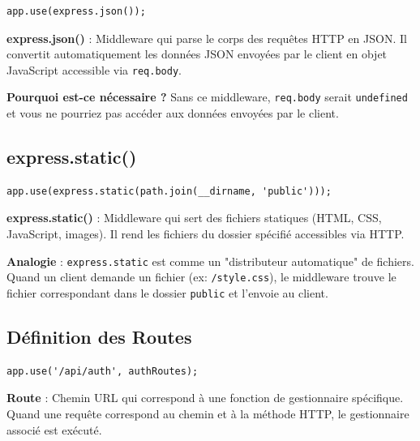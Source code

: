 \begin{lstlisting}[style=javascript]
app.use(express.json());
\end{lstlisting}

\begin{definitionbox}
    \textbf{express.json()} : Middleware qui parse le corps des requêtes HTTP en JSON. Il convertit automatiquement les données JSON envoyées par le client en objet JavaScript accessible via \texttt{req.body}.
\end{definitionbox}

\textbf{Pourquoi est-ce nécessaire ?}
Sans ce middleware, \texttt{req.body} serait \texttt{undefined} et vous ne pourriez pas accéder aux données envoyées par le client.

\subsection{express.static()}

\begin{lstlisting}[style=javascript]
app.use(express.static(path.join(__dirname, 'public')));
\end{lstlisting}

\begin{definitionbox}
    \textbf{express.static()} : Middleware qui sert des fichiers statiques (HTML, CSS, JavaScript, images). Il rend les fichiers du dossier spécifié accessibles via HTTP.
\end{definitionbox}

\begin{analogybox}
    \textbf{Analogie} : \texttt{express.static} est comme un "distributeur automatique" de fichiers. Quand un client demande un fichier (ex: \texttt{/style.css}), le middleware trouve le fichier correspondant dans le dossier \texttt{public} et l'envoie au client.
\end{analogybox}

\subsection{Définition des Routes}

\begin{lstlisting}[style=javascript]
app.use('/api/auth', authRoutes);
\end{lstlisting}

\begin{definitionbox}
    \textbf{Route} : Chemin URL qui correspond à une fonction de gestionnaire spécifique. Quand une requête correspond au chemin et à la méthode HTTP, le gestionnaire associé est exécuté.
\end{definitionbox}

